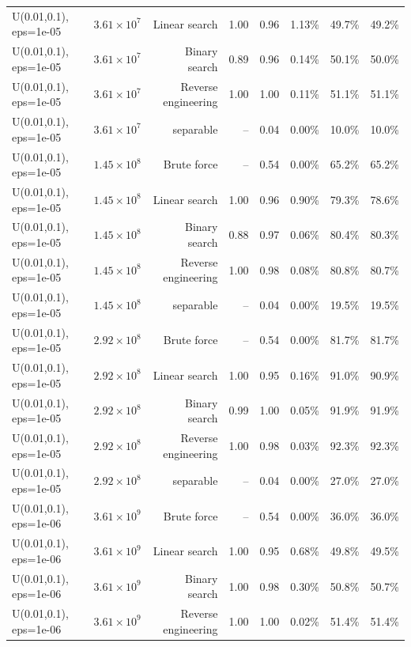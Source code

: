 \begin{tabular}{llrrrrrr}
U(0.01,0.1), eps=1e-05 & $3.61\times 10^{7}$ & Linear search & 1.00 & 0.96 & 1.13\% & 49.7\% & 49.2\% \\
U(0.01,0.1), eps=1e-05 & $3.61\times 10^{7}$ & Binary search & 0.89 & 0.96 & 0.14\% & 50.1\% & 50.0\% \\
U(0.01,0.1), eps=1e-05 & $3.61\times 10^{7}$ & Reverse engineering & 1.00 & 1.00 & 0.11\% & 51.1\% & 51.1\% \\
U(0.01,0.1), eps=1e-05 & $3.61\times 10^{7}$ & separable & -- & 0.04 & 0.00\% & 10.0\% & 10.0\% \\
U(0.01,0.1), eps=1e-05 & $1.45\times 10^{8}$ & Brute force & -- & 0.54 & 0.00\% & 65.2\% & 65.2\% \\
U(0.01,0.1), eps=1e-05 & $1.45\times 10^{8}$ & Linear search & 1.00 & 0.96 & 0.90\% & 79.3\% & 78.6\% \\
U(0.01,0.1), eps=1e-05 & $1.45\times 10^{8}$ & Binary search & 0.88 & 0.97 & 0.06\% & 80.4\% & 80.3\% \\
U(0.01,0.1), eps=1e-05 & $1.45\times 10^{8}$ & Reverse engineering & 1.00 & 0.98 & 0.08\% & 80.8\% & 80.7\% \\
U(0.01,0.1), eps=1e-05 & $1.45\times 10^{8}$ & separable & -- & 0.04 & 0.00\% & 19.5\% & 19.5\% \\
U(0.01,0.1), eps=1e-05 & $2.92\times 10^{8}$ & Brute force & -- & 0.54 & 0.00\% & 81.7\% & 81.7\% \\
U(0.01,0.1), eps=1e-05 & $2.92\times 10^{8}$ & Linear search & 1.00 & 0.95 & 0.16\% & 91.0\% & 90.9\% \\
U(0.01,0.1), eps=1e-05 & $2.92\times 10^{8}$ & Binary search & 0.99 & 1.00 & 0.05\% & 91.9\% & 91.9\% \\
U(0.01,0.1), eps=1e-05 & $2.92\times 10^{8}$ & Reverse engineering & 1.00 & 0.98 & 0.03\% & 92.3\% & 92.3\% \\
U(0.01,0.1), eps=1e-05 & $2.92\times 10^{8}$ & separable & -- & 0.04 & 0.00\% & 27.0\% & 27.0\% \\
U(0.01,0.1), eps=1e-06 & $3.61\times 10^{9}$ & Brute force & -- & 0.54 & 0.00\% & 36.0\% & 36.0\% \\
U(0.01,0.1), eps=1e-06 & $3.61\times 10^{9}$ & Linear search & 1.00 & 0.95 & 0.68\% & 49.8\% & 49.5\% \\
U(0.01,0.1), eps=1e-06 & $3.61\times 10^{9}$ & Binary search & 1.00 & 0.98 & 0.30\% & 50.8\% & 50.7\% \\
U(0.01,0.1), eps=1e-06 & $3.61\times 10^{9}$ & Reverse engineering & 1.00 & 1.00 & 0.02\% & 51.4\% & 51.4\% \\

\end{tabular}
